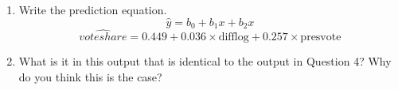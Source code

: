 \documentclass[12pt,letterpaper]{article}
\begin{document}
\begin{enumerate}
		\noindent Holding presidential vote share constant, for each one unit increase in log difference in campaign spending, on average, there is a 0.36 increase in incumbent vote share. Holding log difference in campaign spending constant, for each unit increase in the vote share of the presidential candidate in the incumbent's party, on average there is a 0.257 increase in incumbent vote share. The R$^{2}$ is 0.450, meaning that presidential vote share and difference in campaign spending account for 45\% of the variation in incumbent vote share.\\
		\item Write the prediction equation.
		\begin{equation}
			\hat{y} = b_0 + b_1 x + b_2 x
		\end{equation}	
		\begin{equation}
			\widehat{voteshare} = 0.449 + 0.036 \times  \text{difflog} + 0.257 \times  \text{presvote}
		\end{equation}
		\item What is it in this output that is identical to the output in Question 4? Why do you think this is the case?
		

\end{enumerate}
\end{document}
